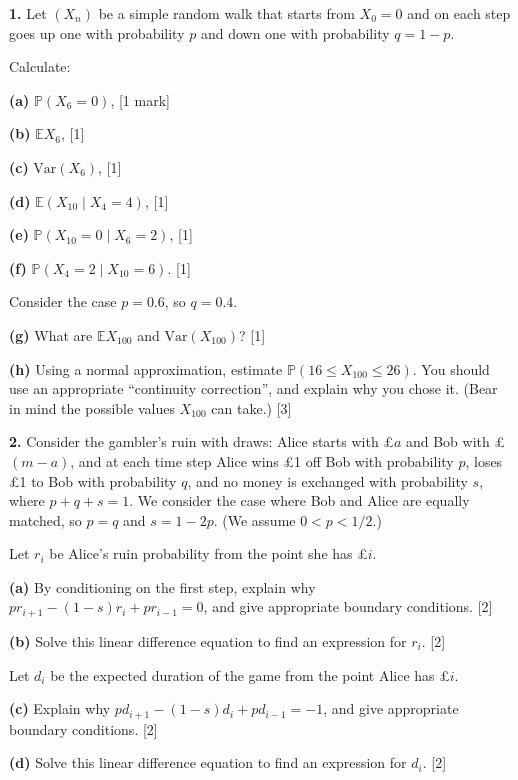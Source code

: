 \documentclass[
  a4paper,
]{article}
\theoremstyle{definition}
\theoremstyle{definition}
\theoremstyle{definition}
\theoremstyle{remark}
\begin{document}
\textbf{1.} Let \((X_n)\) be a simple random walk that starts from \(X_0 = 0\) and on each step goes up one with probability \(p\) and down one with probability \(q = 1-p\).

Calculate:

\textbf{(a)} \(\mathbb P(X_6 = 0)\), {{[}1 mark{]}}

\textbf{(b)} \(\mathbb EX_6\), {{[}1{]}}

\textbf{(c)} \(\text{Var}(X_6)\), {{[}1{]}}

\textbf{(d)} \(\mathbb E(X_{10} \mid X_4 = 4)\), {{[}1{]}}

\textbf{(e)} \(\mathbb P(X_{10} = 0 \mid X_6 = 2)\), {{[}1{]}}

\textbf{(f)} \(\mathbb P(X_4 = 2 \mid X_{10} = 6)\). {{[}1{]}}

Consider the case \(p = 0.6\), so \(q = 0.4\).

\textbf{(g)} What are \(\mathbb E X_{100}\) and \(\text{Var}(X_{100})\)? {{[}1{]}}

\textbf{(h)} Using a normal approximation, estimate \(\mathbb P(16 \leq X_{100} \leq 26)\). You should use an appropriate ``continuity correction'', and explain why you chose it. (Bear in mind the possible values \(X_{100}\) can take.) {{[}3{]}}

\textbf{2.} Consider the gambler's ruin with draws: Alice starts with £\(a\) and Bob with £\((m-a)\), and at each time step Alice wins £1 off Bob with probability \(p\), loses £1 to Bob with probability \(q\), and no money is exchanged with probability \(s\), where \(p+q+s =1\). We consider the case where Bob and Alice are equally matched, so \(p = q\) and \(s = 1-2p\). (We assume \(0 < p < 1/2\).)

Let \(r_i\) be Alice's ruin probability from the point she has £\(i\).

\textbf{(a)} By conditioning on the first step, explain why \(pr_{i+1} - (1-s)r_i + pr_{i-1} = 0\), and give appropriate boundary conditions. {{[}2{]}}

\textbf{(b)} Solve this linear difference equation to find an expression for \(r_i\). {{[}2{]}}

Let \(d_i\) be the expected duration of the game from the point Alice has £\(i\).

\textbf{(c)} Explain why \(pd_{i+1} - (1-s)d_i + pd_{i-1} = -1\), and give appropriate boundary conditions. {{[}2{]}}

\textbf{(d)} Solve this linear difference equation to find an expression for \(d_i\). {{[}2{]}}
\end{document}
